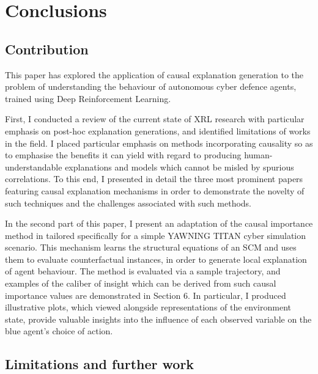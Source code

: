 \documentclass{article}
\begin{document}

\pagebreak

\section{Conclusions} 

\subsection{Contribution}
This paper has explored the application of causal explanation generation to the problem of understanding the behaviour of autonomous cyber defence agents, trained using Deep Reinforcement Learning. 

First, I conducted a review of the current state of XRL research with particular emphasis on post-hoc explanation generations, and identified limitations of works in the field. I placed particular emphasis on methods incorporating causality so as to emphasise the benefits it can yield with regard to producing human-understandable explanations and models which cannot be misled by spurious correlations. To this end, I presented in detail the three most prominent papers featuring causal explanation mechanisms in order to demonstrate the novelty of such techniques and the challenges associated with such methods. 

In the second part of this paper, I present an adaptation of the causal importance method in \cite{wang2022causal} tailored specifically for a simple YAWNING TITAN cyber simulation scenario. This mechanism learns the structural equations of an SCM and uses them to evaluate counterfactual instances, in order to generate local explanation of agent behaviour. The method is evaluated via a sample trajectory, and examples of the caliber of insight which can be derived from such causal importance values are demonstrated in Section 6. In particular, I produced illustrative plots, which viewed alongside representations of the environment state, provide valuable insights into the influence of each observed variable on the blue agent's choice of action. 


\subsection{Limitations and further work}
\end{document}
